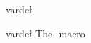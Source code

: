 \documentclass{stex}
\begin{document}
  \begin{smodule}[title=The \texttt{vardef}-Macro]{vardef}
  
  \begin{sfunction}{vardef}{\vardef}
    The \dcs-macro
  \end{sfunction}
   
  \end{smodule}
\end{document}
